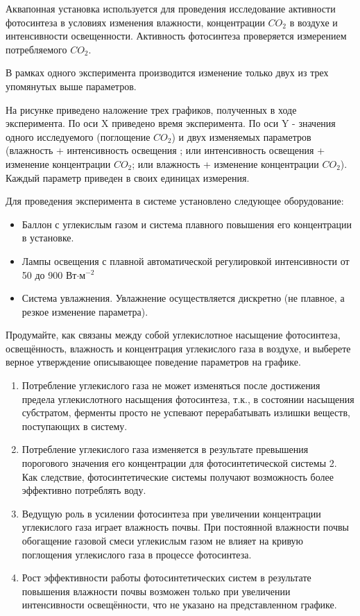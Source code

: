 
Аквапонная установка используется для проведения  исследование активности фотосинтеза в условиях 
изменения влажности, концентрации $CO_2$ в воздухе и интенсивности освещенности. Активность фотосинтеза проверяется измерением потребляемого $CO_2$.

В рамках одного эксперимента производится изменение только двух из трех упомянутых выше параметров.  

На рисунке приведено наложение трех графиков, полученных в ходе эксперимента. По оси X приведено время эксперимента. По оси Y - значения одного исследуемого (поглощение $CO_2$) и двух изменяемых параметров (влажность + интенсивность освещения ; или интенсивность освещения + изменение концентрации $CO_2$; или влажность + изменение концентрации $CO_2$). Каждый параметр приведен в своих единицах измерения.

Для проведения эксперимента в системе установлено следующее оборудование:

\begin{itemize}
    \item Баллон с углекислым газом и система плавного повышения его концентрации в установке.
    \item Лампы освещения с плавной автоматической регулировкой интенсивности от 50 до 900 Вт$\cdot$м$^{-2}$
    \item Система увлажнения. Увлажнение осуществляется дискретно (не плавное, а резкое изменение параметра).
\end{itemize}

Продумайте, как связаны между собой углекислотное насыщение фотосинтеза, освещённость, влажность и концентрация углекислого газа в воздухе, и выберете верное утверждение описывающее поведение параметров на графике.


\begin{enumerate}
    \item Потребление углекислого газа не может изменяться после достижения предела углекислотного насыщения фотосинтеза, т.к., в состоянии насыщения субстратом, ферменты просто не успевают перерабатывать излишки веществ, поступающих в систему.
    \item Потребление углекислого газа изменяется в результате превышения порогового значения его концентрации для фотосинтетической системы 2. Как следствие, фотосинтетические системы получают возможность более эффективно потреблять воду.
    \item Ведущую роль в усилении фотосинтеза при увеличении концентрации углекислого газа играет влажность почвы. При постоянной влажности почвы обогащение газовой смеси углекислым газом не влияет на кривую поглощения углекислого газа в процессе фотосинтеза.
    \item Рост эффективности работы фотосинтетических систем в результате повышения влажности почвы возможен только при увеличении интенсивности освещённости, что не указано на представленном графике.
\end{enumerate}